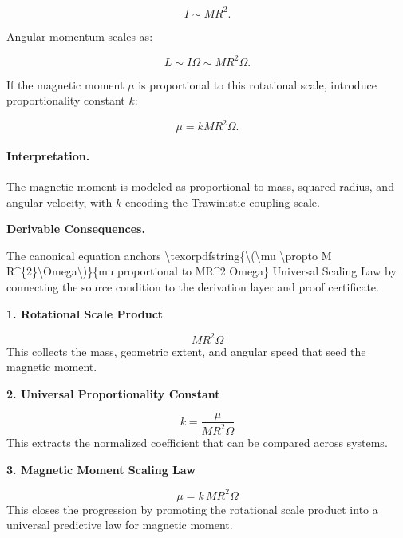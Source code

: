 \begin{equation}
I
\sim
MR^2 .
\end{equation}

Angular momentum scales as:

\begin{equation}
L
\sim
I\Omega
\sim
MR^2\Omega .
\end{equation}

If the magnetic moment $\mu$ is proportional to this rotational scale, introduce proportionality constant $k$:

\begin{equation}
\boxed{
\mu
=
kMR^2\Omega .
}
\end{equation}

\paragraph{Interpretation.}
The magnetic moment is modeled as proportional to mass, squared radius, and angular velocity, with $k$ encoding the Trawinistic coupling scale.

\par\vspace{0.35em}
\noindent\textbf{Derivable Consequences.}\quad
\begingroup
\footnotesize
\raggedright
The canonical equation anchors \textbackslash{}texorpdfstring\{\textbackslash{}(\textbackslash{}mu \textbackslash{}propto M R\textasciicircum{}\{2\}\textbackslash{}Omega\textbackslash{})\}\{mu proportional to MR\textasciicircum{}2 Omega\} Universal Scaling Law by connecting the source condition to the derivation layer and proof certificate.
\par\endgroup

\noindent\textbf{1. Rotational Scale Product}\par
\[
M R^{2}\Omega
\]
\noindent This collects the mass, geometric extent, and angular speed that seed the magnetic moment.\par
\noindent\textbf{2. Universal Proportionality Constant}\par
\[
k = \frac{\mu}{M R^{2}\Omega}
\]
\noindent This extracts the normalized coefficient that can be compared across systems.\par
\noindent\textbf{3. Magnetic Moment Scaling Law}\par
\[
\mu
=
k\,M R^{2}\Omega
\]
\noindent This closes the progression by promoting the rotational scale product into a universal predictive law for magnetic moment.\par


